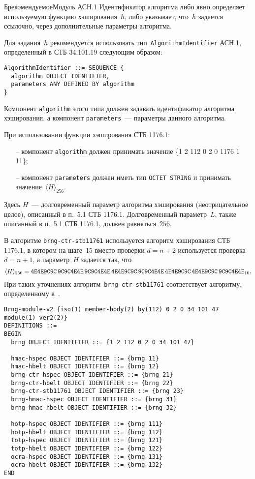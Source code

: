 \begin{appendix}{Б}{рекомендуемое}{Модуль АСН.1}
Идентификатор алгоритма либо явно определяет используемую функцию хэширования~$h$,
либо указывает, что~$h$ задается ссылочно, через дополнительные параметры алгоритма.

Для задания~$h$ рекомендуется использовать 
тип~\texttt{AlgorithmIdentifier} АСН.1,
определенный в СТБ 34.101.19 следующим образом:
\begin{verbatim}
AlgorithmIdentifier ::= SEQUENCE {
  algorithm OBJECT IDENTIFIER,
  parameters ANY DEFINED BY algorithm	 
}
\end{verbatim}
%
Компонент \verb|algorithm| этого типа должен задавать идентификатор 
алгоритма хэширования, а компонент \verb|parameters|~--- 
параметры данного алгоритма. 

При использовании функции хэширования СТБ 1176.1:
\begin{itemize} 
\item[--]
компонент \texttt{algorithm} должен принимать значение 
\{1 2 112 0 2 0 1176 1 11\};
\item[--]
компонент \texttt{parameters} должен иметь тип \texttt{OCTET STRING}
и принимать значение~$\langle H\rangle_{256}$.
\end{itemize}
%
Здесь $H$~--- долговременный параметр алгоритма хэширования
(неотрицательное целое), 
описанный в п.~5.1 СТБ 1176.1. 
Долговременный параметр~$L$, также описанный в п.~5.1 СТБ 1176.1, 
должен равняться~$256$.

В алгоритме \texttt{brng-ctr-stb11761} используется алгоритм
хэширования СТБ 1176.1, в котором на шаге~15 
вместо проверки $d=n+2$ используется проверка $d=n+1$,
а параметр~$H$ задается так, что
$$
\langle H\rangle_{256}=
\texttt{4E4E9C9C\,9C9C4E4E\,9C9C4E4E\,4E4E9C9C\,9C9C4E4E\,4E4E9C9C\,4E4E9C9C\,9C9C4E4E}_{16}.
$$
При таких уточнениях алгоритм~\texttt{brng-ctr-stb11761}
соответствует алгоритму, определенному в~\cite{RD-PRNG}.


\begin{verbatim}
Brng-module-v2 {iso(1) member-body(2) by(112) 0 2 0 34 101 47 module(1) ver2(2)}
DEFINITIONS ::=
BEGIN
  brng OBJECT IDENTIFIER ::= {1 2 112 0 2 0 34 101 47}
  
  hmac-hspec OBJECT IDENTIFIER ::= {brng 11}
  hmac-hbelt OBJECT IDENTIFIER ::= {brng 12}
  brng-ctr-hspec OBJECT IDENTIFIER ::= {brng 21}
  brng-ctr-hbelt OBJECT IDENTIFIER ::= {brng 22}
  brng-ctr-stb11761 OBJECT IDENTIFIER ::= {brng 23}
  brng-hmac-hspec OBJECT IDENTIFIER ::= {brng 31}
  brng-hmac-hbelt OBJECT IDENTIFIER ::= {brng 32}

  hotp-hspec OBJECT IDENTIFIER ::= {brng 111}
  hotp-hbelt OBJECT IDENTIFIER ::= {brng 112}
  totp-hspec OBJECT IDENTIFIER ::= {brng 121}
  totp-hbelt OBJECT IDENTIFIER ::= {brng 122}
  ocra-hspec OBJECT IDENTIFIER ::= {brng 131}
  ocra-hbelt OBJECT IDENTIFIER ::= {brng 132}
END             
\end{verbatim}
\end{appendix}

